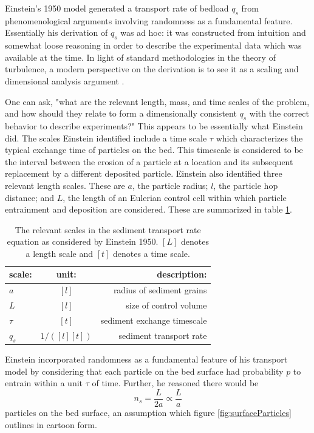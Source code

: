 Einstein's 1950 model generated a transport rate of bedload $q_s$ from phenomenological arguments involving randomness as a fundamental feature.
Essentially his derivation of $q_s$ was ad hoc: it was constructed from intuition and somewhat loose reasoning in order to describe the experimental data which was available at the time. 
In light of standard methodologies in the theory of turbulence, a modern perspective on the derivation is to see it as a scaling and dimensional analysis argument \citep{}. 

One can ask, "what are the relevant length, mass, and time scales of the problem, and how should they relate to form a dimensionally consistent $q_s$ with the correct behavior to describe experiments?" 
This appears to be essentially what Einstein did. 
The scales Einstein identified include a time scale $\tau$ which characterizes the typical exchange time of particles on the bed. 
This timescale is considered to be the interval between the erosion of a particle at a location and its subsequent replacement by a different deposited particle.  
Einstein also identified three relevant length scales. 
These are $a$, the particle radius; $l$, the particle hop distance; and $L$, the length of an Eulerian control cell within which particle entrainment and deposition are considered. These are summarized in table \ref{tab:einsteinScales}.

\begin{table}
\caption{The relevant scales in the sediment transport rate equation as considered by Einstein 1950. $[L]$ denotes a length scale and $[t]$ denotes a time scale.}
\label{tab:einsteinScales}
\begin{center}
\begin{tabular}{l|c|r}
\textbf{scale}: & \textbf{unit}: & \textbf{description}: \\ 
\hline
$a$ & $[l]$ & radius of sediment grains \\
$L$ & $[l]$ & size of control volume \\
$\tau$ & $[t]$ & sediment exchange timescale \\
$q_s$ & $1/([l][t])$ & sediment transport rate

\end{tabular} 
\end{center} 
\end{table} 

Einstein incorporated randomness as a fundamental feature of his transport model by considering that each particle on the bed surface had probability $p$ to entrain within a unit $\tau$ of time. 
Further, he reasoned there would be  
$$ n_s = \frac{L}{2a} \propto \frac{L}{a} $$ 
particles on the bed surface, an assumption which figure \ref{fig:surfaceParticles} outlines in cartoon form. 

